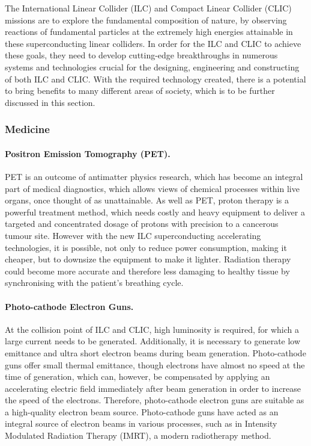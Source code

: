 The International Linear Collider (ILC) and Compact Linear Collider (CLIC) missions are to explore the fundamental composition of nature, by observing reactions of fundamental particles at the extremely high energies attainable in these superconducting linear colliders. In order for the ILC and CLIC to achieve these goals, they need to develop cutting-edge breakthroughs in numerous systems and technologies crucial for the designing, engineering and constructing of both ILC and CLIC. With the required technology created, there is a potential to bring benefits to many different areas of society, which is to be further discussed in this section. \cite{ILC:SpinOffReport}

\subsubsection{Medicine}
 
\paragraph{Positron Emission Tomography (PET).}
 
PET is an outcome of antimatter physics research, which has become an integral part of medical diagnostics, which allows views of chemical processes within live organs, once thought of as unattainable. As well as PET, proton therapy is a powerful treatment method, which needs costly and heavy equipment to deliver a targeted and concentrated dosage of protons with precision to a cancerous tumour site. However with the new ILC superconducting accelerating technologies, it is possible, not only to reduce power consumption, making it cheaper, but to downsize the equipment to make it lighter. Radiation therapy could become more accurate and therefore less damaging to healthy tissue by synchronising with the patient's breathing cycle.
 
\paragraph{Photo-cathode Electron Guns.}

At the collision point of ILC and CLIC, high luminosity is required, for which a large current needs to be generated. Additionally, it is necessary to generate low emittance and ultra short electron beams during beam generation. Photo-cathode guns offer small thermal emittance, though electrons have almost no speed at the time of generation, which can, however, be compensated by applying an accelerating electric field immediately after beam generation in order to increase the speed of the electrons. Therefore, photo-cathode electron guns are suitable as a high-quality electron beam source. Photo-cathode guns have acted as an integral source of electron beams in various processes, such as in Intensity Modulated Radiation Therapy (IMRT), a modern radiotherapy method.

